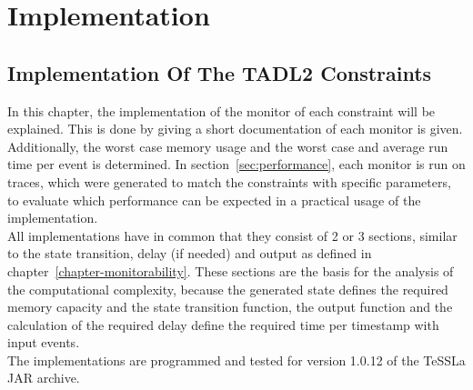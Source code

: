 
\chapter{Implementation}
\label{chapter-implementation}
	\section{Implementation Of The TADL2 Constraints}
	In this chapter, the implementation of the monitor of each constraint will be explained. This is done by giving a short documentation of each monitor is given. Additionally, the worst case memory usage and the worst case and average run time per event is determined. In section~\ref{sec:performance}, each monitor is run on traces, which were generated to match the constraints with specific parameters, to evaluate which performance can be expected in a practical usage of the implementation.\\
	All implementations have in common that they consist of 2 or 3 sections, similar to the state transition, delay (if needed) and output as defined in chapter~\ref{chapter-monitorability}. These sections are the basis for the analysis of the computational complexity, because the generated state defines the required memory capacity and the state transition function, the output function and the calculation of the required delay define the required time per timestamp with input events.\\
	The implementations are programmed and tested for version 1.0.12 of the TeSSLa JAR archive.
	 

